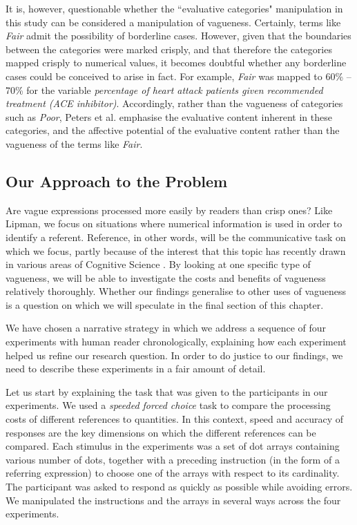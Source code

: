 \documentclass[%
man,		%
floatsintext,%
apacite%
]{apa6} %
\begin{document}
It is, however, questionable whether the ``evaluative categories" manipulation in this study can be considered a manipulation of vagueness. Certainly, terms like \emph{Fair} admit the possibility of borderline cases. However, given that the boundaries between the categories were marked crisply, and that therefore the categories mapped crisply to numerical values, it becomes doubtful whether any borderline cases could be conceived to arise in fact. For example, \emph{Fair} was mapped to 60\% -- 70\% for the variable \emph{percentage of heart attack patients given recommended treatment (ACE inhibitor)}. Accordingly, rather than the vagueness of categories such as \emph{Poor}, Peters et al. emphasise the evaluative content inherent in these categories, and the affective potential of the evaluative content rather than the vagueness of the terms like {\em Fair}.

\subsection{Our Approach to the Problem}\label{method}

Are vague expressions processed more easily by readers than crisp ones? Like Lipman, we focus on situations where numerical information is used in order to identify a referent. Reference, in other words, will be the communicative task on which we focus, partly because of the interest that this topic has recently drawn in various areas of Cognitive Science \cite{vanDeemterCMR}. By looking at one specific type of vagueness, we will be able to investigate the costs and benefits of vagueness relatively thoroughly. Whether our findings generalise to other uses of vagueness is a question on which we will speculate in the final section of this chapter.

We have chosen a narrative strategy in which we address a sequence of four experiments with human reader chronologically, explaining how each experiment helped us refine our research question. In order to do justice to our findings, we need to describe these experiments in a fair amount of detail. 

Let us start by explaining the task that was given to the participants in our experiments. We used a {\em speeded forced choice} task to compare the processing costs of different references to quantities. In this context, speed and accuracy of responses are the key dimensions on which the different references can be compared. Each stimulus in the experiments was a set of dot arrays containing various number of dots, together with a preceding instruction (in the form of a referring expression) to choose one of the arrays with respect to its cardinality. The participant was asked to respond as quickly as possible while avoiding errors. We manipulated the instructions and the arrays in several ways across the four experiments. 
\end{document}
